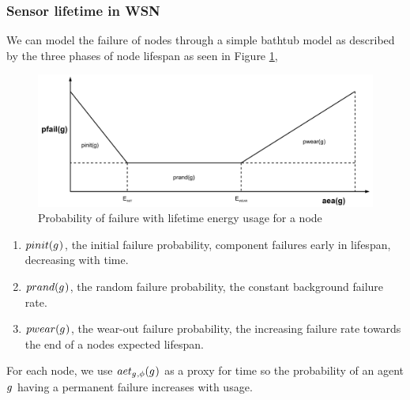 \subsubsection{Sensor lifetime in WSN}
We can model the failure of nodes through a simple bathtub model as described by the three phases of node lifespan as seen in Figure \ref{fig:node_reliability_lifespan},
\begin{figure}
	\centering
	\includegraphics[width=0.7\linewidth]{node_reliability_lifespan}
	\caption[Probability of failure with lifetime energy usage for a node]{Probability of failure with lifetime energy usage for a node}
	\label{fig:node_reliability_lifespan}
\end{figure}
\begin{enumerate}
	\item $\functionProbabilityInit{}{}$, the initial failure probability, component failures early in lifespan, decreasing with time.
	\item $\functionProbabilityRand{}{}$, the random failure probability, the constant background failure rate.
	\item $\functionProbabilityWear{}{}$, the wear-out failure probability, the increasing failure rate towards the end of a nodes expected lifespan.
\end{enumerate}
For each node, we use $\functionAgentEnergyTotal{}{}$ as a proxy for time so the probability of an agent $g_{}^{}$ having a permanent failure increases with usage.




